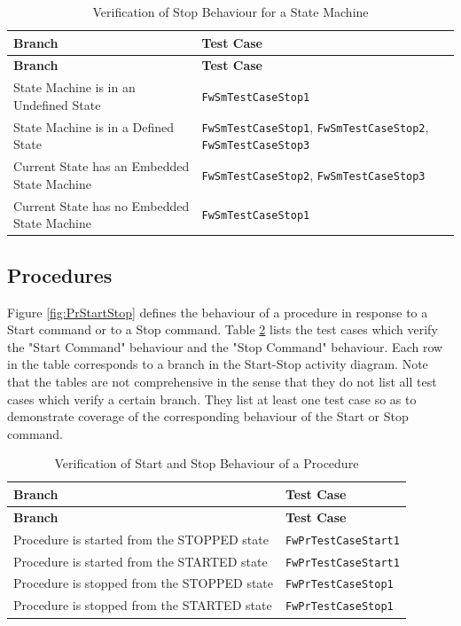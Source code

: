 \documentclass[requirements]{../fwprofile}
\begin{document}
\begin{longtable}{|p{7.7cm}|p{3.5cm}|}
\caption{Verification of Stop Behaviour for a State Machine} \label{tab:SM_Stop}\\
\hline
\rowcolor{gray}
\textbf{Branch} & \textbf{Test Case} \\
\hline
\endfirsthead
\rowcolor{gray}
\textbf{Branch} & \textbf{Test Case} \\
\hline
\endhead
State Machine is in an Undefined State & \texttt{FwSmTestCaseStop1} \\
\hline
State Machine is in a Defined State & \texttt{FwSmTestCaseStop1}, \texttt{FwSmTestCaseStop2}, \texttt{FwSmTestCaseStop3} \\
\hline
Current State has an Embedded State Machine & \texttt{FwSmTestCaseStop2}, \texttt{FwSmTestCaseStop3} \\
\hline
Current State has no Embedded State Machine & \texttt{FwSmTestCaseStop1} \\
\hline
\end{longtable}

\subsection{Procedures}\label{Appendix_C_PR_Start_Stop}
Figure \ref{fig:PrStartStop} defines the behaviour of a procedure in response to a 
Start command or to a Stop command. 
Table \ref{tab:PR_StartStop} lists the test cases which verify the "Start Command" 
behaviour and the "Stop Command" behaviour. 
Each row in the table corresponds to a branch in the Start-Stop activity diagram. 
Note that the tables are not comprehensive in the sense that they do not list all test 
cases which verify a certain branch. 
They list at least one test case so as to demonstrate coverage  of the corresponding 
behaviour of the Start or Stop command.

\begin{longtable}{|p{7.7cm}|p{3.5cm}|}
\caption{Verification of Start and Stop Behaviour of a Procedure}\label{tab:PR_StartStop} \\
\hline
\rowcolor{gray}
\textbf{Branch} & \textbf{Test Case} \\
\hline
\endfirsthead
\rowcolor{gray}
\textbf{Branch} & \textbf{Test Case} \\
\hline
\endhead
Procedure is started from the STOPPED state & \texttt{FwPrTestCaseStart1} \\
\hline
Procedure is started from the STARTED state & \texttt{FwPrTestCaseStart1} \\
\hline
Procedure is stopped from the STOPPED state & \texttt{FwPrTestCaseStop1} \\
\hline
Procedure is stopped from the STARTED state & \texttt{FwPrTestCaseStop1} \\
\hline
\end{longtable}
\end{document}
